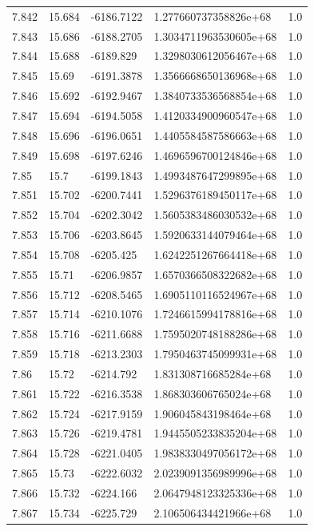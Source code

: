 \begin{tabular}{lllll}
7.842 & 15.684 & -6186.7122 & 1.277660737358826e+68 & 1.0 \\
7.843 & 15.686 & -6188.2705 & 1.3034711963530605e+68 & 1.0 \\
7.844 & 15.688 & -6189.829 & 1.3298030612056467e+68 & 1.0 \\
7.845 & 15.69 & -6191.3878 & 1.3566668650136968e+68 & 1.0 \\
7.846 & 15.692 & -6192.9467 & 1.3840733536568854e+68 & 1.0 \\
7.847 & 15.694 & -6194.5058 & 1.4120334900960547e+68 & 1.0 \\
7.848 & 15.696 & -6196.0651 & 1.4405584587586663e+68 & 1.0 \\
7.849 & 15.698 & -6197.6246 & 1.4696596700124846e+68 & 1.0 \\
7.85 & 15.7 & -6199.1843 & 1.4993487647299895e+68 & 1.0 \\
7.851 & 15.702 & -6200.7441 & 1.5296376189450117e+68 & 1.0 \\
7.852 & 15.704 & -6202.3042 & 1.5605383486030532e+68 & 1.0 \\
7.853 & 15.706 & -6203.8645 & 1.5920633144079464e+68 & 1.0 \\
7.854 & 15.708 & -6205.425 & 1.6242251267664418e+68 & 1.0 \\
7.855 & 15.71 & -6206.9857 & 1.6570366508322682e+68 & 1.0 \\
7.856 & 15.712 & -6208.5465 & 1.6905110116524967e+68 & 1.0 \\
7.857 & 15.714 & -6210.1076 & 1.7246615994178816e+68 & 1.0 \\
7.858 & 15.716 & -6211.6688 & 1.7595020748188286e+68 & 1.0 \\
7.859 & 15.718 & -6213.2303 & 1.7950463745099931e+68 & 1.0 \\
7.86 & 15.72 & -6214.792 & 1.831308716685284e+68 & 1.0 \\
7.861 & 15.722 & -6216.3538 & 1.868303606765024e+68 & 1.0 \\
7.862 & 15.724 & -6217.9159 & 1.906045843198464e+68 & 1.0 \\
7.863 & 15.726 & -6219.4781 & 1.9445505233835204e+68 & 1.0 \\
7.864 & 15.728 & -6221.0405 & 1.9838330497056172e+68 & 1.0 \\
7.865 & 15.73 & -6222.6032 & 2.0239091356989996e+68 & 1.0 \\
7.866 & 15.732 & -6224.166 & 2.0647948123325336e+68 & 1.0 \\
7.867 & 15.734 & -6225.729 & 2.106506434421966e+68 & 1.0 \\

\end{tabular}
